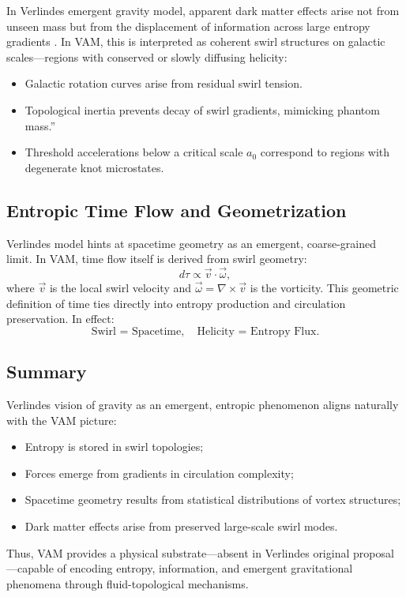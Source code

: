 In Verlinde\rqs s emergent gravity model, apparent dark matter effects arise not from unseen mass but from the displacement of information across large entropy gradients \cite{Verlinde2016}. In VAM, this is interpreted as coherent swirl structures on galactic scales—regions with conserved or slowly diffusing helicity:
\begin{itemize}
    \item Galactic rotation curves arise from residual swirl tension.
    \item Topological inertia prevents decay of swirl gradients, mimicking \grqq phantom mass.\textquotedblright
    \item Threshold accelerations below a critical scale $a_0$ correspond to regions with degenerate knot microstates.
\end{itemize}

\subsection*{Entropic Time Flow and Geometrization}

Verlinde\rqs s model hints at spacetime geometry as an emergent, coarse-grained limit. In VAM, time flow itself is derived from swirl geometry:
\begin{equation}
d\tau \propto \vec{v} \cdot \vec{\omega},
\end{equation}
where $\vec{v}$ is the local swirl velocity and $\vec{\omega} = \nabla \times \vec{v}$ is the vorticity. This geometric definition of time ties directly into entropy production and circulation preservation. In effect:
\[
\text{Swirl = Spacetime}, \quad \text{Helicity = Entropy Flux}.
\]

\subsection*{Summary}

Verlinde\rqs s vision of gravity as an emergent, entropic phenomenon aligns naturally with the VAM picture:
\begin{itemize}
    \item Entropy is stored in swirl topologies;
    \item Forces emerge from gradients in circulation complexity;
    \item Spacetime geometry results from statistical distributions of vortex structures;
    \item Dark matter effects arise from preserved large-scale swirl modes.
\end{itemize}
Thus, VAM provides a physical substrate—absent in Verlinde\rqs s original proposal—capable of encoding entropy, information, and emergent gravitational phenomena through fluid-topological mechanisms.

